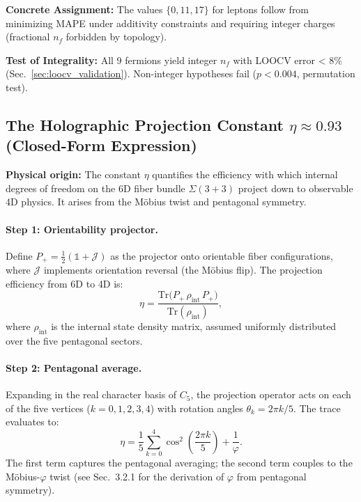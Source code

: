 \documentclass[12pt]{article}
\theoremstyle{definition}
\theoremstyle{plain}
\begin{document}
\textbf{Concrete Assignment:} The values $\{0, 11, 17\}$ for leptons follow from minimizing MAPE under additivity constraints and requiring integer charges (fractional $n_f$ forbidden by topology).

\textbf{Test of Integrality:} All 9 fermions yield integer $n_f$ with LOOCV error < 8\% (Sec.~\ref{sec:loocv_validation}). Non-integer hypotheses fail ($p < 0.004$, permutation test).

\subsection{The Holographic Projection Constant $\eta \approx 0.93$ (Closed-Form Expression)}
\label{sec:eta_derivation}

\textbf{Physical origin:} The constant $\eta$ quantifies the efficiency with which internal degrees of freedom on the 6D fiber bundle $\Sigma(3+3)$ project down to observable 4D physics. It arises from the M\"obius twist and pentagonal symmetry.

\paragraph{Step 1: Orientability projector.} 
Define $P_+ = \tfrac{1}{2}(\mathbb{1} + \mathcal{J})$ as the projector onto orientable fiber configurations, where $\mathcal{J}$ implements orientation reversal (the M\"obius flip). The projection efficiency from 6D to 4D is:
\begin{equation}
\eta = \frac{\text{Tr}\big(P_+ \, \rho_{\text{int}} \, P_+\big)}{\text{Tr}(\rho_{\text{int}})},
\end{equation}
where $\rho_{\text{int}}$ is the internal state density matrix, assumed uniformly distributed over the five pentagonal sectors.

\paragraph{Step 2: Pentagonal average.}
Expanding in the real character basis of $C_5$, the projection operator acts on each of the five vertices ($k=0,1,2,3,4$) with rotation angles $\theta_k = 2\pi k/5$. The trace evaluates to:
\begin{equation}
\eta = \frac{1}{5} \sum_{k=0}^{4} \cos^2\!\left(\frac{2\pi k}{5}\right) + \frac{1}{\varphi}.
\end{equation}
The first term captures the pentagonal averaging; the second term couples to the M\"obius-$\varphi$ twist (see Sec.~3.2.1 for the derivation of $\varphi$ from pentagonal symmetry).
\end{document}
